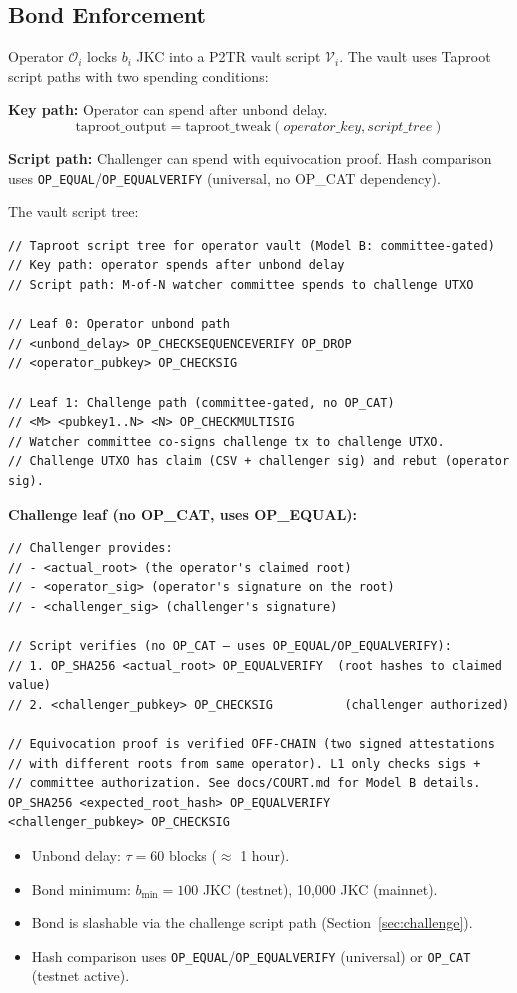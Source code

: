 \documentclass[a4paper,11pt]{article}
\begin{document}
\subsection{Bond Enforcement}

Operator $\mathcal{O}_i$ locks $b_i$ JKC into a P2TR vault script $\mathcal{V}_i$. The vault uses Taproot script paths with two spending conditions:

\textbf{Key path:} Operator can spend after unbond delay.
\[
    \text{taproot\_output} = \text{taproot\_tweak}(operator\_key, script\_tree)
\]

\textbf{Script path:} Challenger can spend with equivocation proof. Hash comparison uses \texttt{OP\_EQUAL}/\texttt{OP\_EQUALVERIFY} (universal, no OP\_CAT dependency).

The vault script tree:
\begin{lstlisting}[style=script]
// Taproot script tree for operator vault (Model B: committee-gated)
// Key path: operator spends after unbond delay
// Script path: M-of-N watcher committee spends to challenge UTXO

// Leaf 0: Operator unbond path
// <unbond_delay> OP_CHECKSEQUENCEVERIFY OP_DROP
// <operator_pubkey> OP_CHECKSIG

// Leaf 1: Challenge path (committee-gated, no OP_CAT)
// <M> <pubkey1..N> <N> OP_CHECKMULTISIG
// Watcher committee co-signs challenge tx to challenge UTXO.
// Challenge UTXO has claim (CSV + challenger sig) and rebut (operator sig).
\end{lstlisting}

\textbf{Challenge leaf (no OP\_CAT, uses OP\_EQUAL):}
\begin{lstlisting}[style=script]
// Challenger provides:
// - <actual_root> (the operator's claimed root)
// - <operator_sig> (operator's signature on the root)
// - <challenger_sig> (challenger's signature)

// Script verifies (no OP_CAT — uses OP_EQUAL/OP_EQUALVERIFY):
// 1. OP_SHA256 <actual_root> OP_EQUALVERIFY  (root hashes to claimed value)
// 2. <challenger_pubkey> OP_CHECKSIG          (challenger authorized)

// Equivocation proof is verified OFF-CHAIN (two signed attestations
// with different roots from same operator). L1 only checks sigs +
// committee authorization. See docs/COURT.md for Model B details.
OP_SHA256 <expected_root_hash> OP_EQUALVERIFY
<challenger_pubkey> OP_CHECKSIG
\end{lstlisting}

\begin{itemize}[nosep]
    \item Unbond delay: $\tau = 60$ blocks ($\approx$ 1 hour).
    \item Bond minimum: $b_{\min} = 100$ JKC (testnet), 10,000 JKC (mainnet).
    \item Bond is slashable via the challenge script path (Section~\ref{sec:challenge}).
    \item Hash comparison uses \texttt{OP\_EQUAL}/\texttt{OP\_EQUALVERIFY} (universal) or \texttt{OP\_CAT} (testnet active).
\end{itemize}
\end{document}
